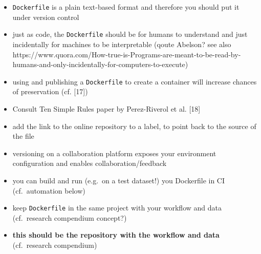 \documentclass[10pt,letterpaper]{article}
\providecommand{\tightlist}{%
  \setlength{\itemsep}{0pt}\setlength{\parskip}{0pt}}
\begin{document}
\begin{itemize}
\tightlist
\item
  \texttt{Dockerfile} is a plain text-based format and therefore you
  should put it under version control
\item
  just as code, the \texttt{Dockerfile} should be for humans to
  understand and just incidentally for machines to be interpretable
  (qoute Abelson? see also
  https://www.quora.com/How-true-is-Programs-are-meant-to-be-read-by-humans-and-only-incidentally-for-computers-to-execute)
\item
  using and publishing a \texttt{Dockerfile} to create a container will
  increase chances of preservation (cf. {[}17{]})
\item
  Consult Ten Simple Rules paper by Perez-Riverol et al. {[}18{]}
\item
  add the link to the online repository to a label, to point back to the
  source of the file
\item
  versioning on a collaboration platform exposes your environment
  configuration and enables collaboration/feedback
\item
  you can build and run (e.g.~on a test dataset!) you Dockerfile in CI
  (cf.~automation below)
\item
  keep \texttt{Dockerfile} in the same project with your workflow and
  data (cf.~research compendium concept?)
\item
  \textbf{this should be the repository with the workflow and data}
  (cf.~research compendium)


\end{itemize}
\end{document}
